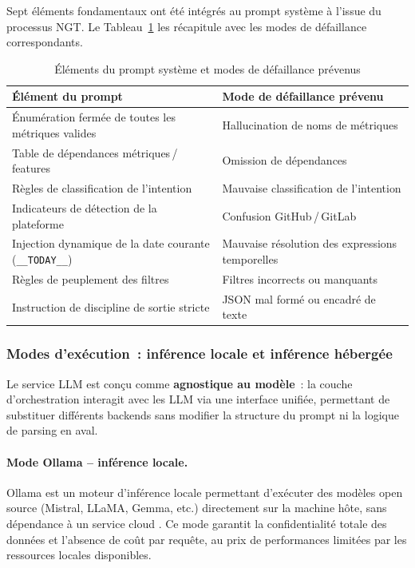 Sept éléments fondamentaux ont été intégrés au prompt système à l'issue du processus NGT. Le
Tableau~\ref{tab:prompt_elements_fr} les récapitule avec les modes de défaillance correspondants.

\begin{table}[H]
\centering
\small
\caption{Éléments du prompt système et modes de défaillance prévenus}
\label{tab:prompt_elements_fr}
\begin{tabular}{|>{\raggedright\arraybackslash}p{6.5cm}
                |>{\raggedright\arraybackslash}p{6.5cm}|}
\hline
\textbf{Élément du prompt} & \textbf{Mode de défaillance prévenu} \\
\hline
Énumération fermée de toutes les métriques valides & Hallucination de noms de métriques \\
\hline
Table de dépendances métriques\,/\,features & Omission de dépendances \\
\hline
Règles de classification de l'intention & Mauvaise classification de l'intention \\
\hline
Indicateurs de détection de la plateforme & Confusion GitHub\,/\,GitLab \\
\hline
Injection dynamique de la date courante (\texttt{\_\_TODAY\_\_}) & Mauvaise résolution des expressions temporelles \\
\hline
Règles de peuplement des filtres & Filtres incorrects ou manquants \\
\hline
Instruction de discipline de sortie stricte & JSON mal formé ou encadré de texte \\
\hline
\end{tabular}
\end{table}

\subsubsection*{Modes d'exécution~: inférence locale et inférence hébergée}

Le service LLM est conçu comme \textbf{agnostique au modèle}~: la couche d'orchestration
interagit avec les LLM via une interface unifiée, permettant de substituer différents backends
sans modifier la structure du prompt ni la logique de parsing en aval.

\paragraph{Mode Ollama -- inférence locale.} Ollama est un moteur d'inférence locale permettant
d'exécuter des modèles open source (Mistral, LLaMA, Gemma, etc.) directement sur la machine hôte,
sans dépendance à un service cloud \parencite{ollama2023}. Ce mode garantit la confidentialité
totale des données et l'absence de coût par requête, au prix de performances limitées par les
ressources locales disponibles.


